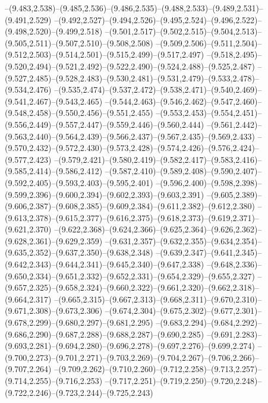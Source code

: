   --(9.483,2.538)--(9.485,2.536)--(9.486,2.535)--(9.488,2.533)--(9.489,2.531)--(9.491,2.529)%
  --(9.492,2.527)--(9.494,2.526)--(9.495,2.524)--(9.496,2.522)--(9.498,2.520)--(9.499,2.518)%
  --(9.501,2.517)--(9.502,2.515)--(9.504,2.513)--(9.505,2.511)--(9.507,2.510)--(9.508,2.508)%
  --(9.509,2.506)--(9.511,2.504)--(9.512,2.503)--(9.514,2.501)--(9.515,2.499)--(9.517,2.497)%
  --(9.518,2.495)--(9.520,2.494)--(9.521,2.492)--(9.522,2.490)--(9.524,2.488)--(9.525,2.487)%
  --(9.527,2.485)--(9.528,2.483)--(9.530,2.481)--(9.531,2.479)--(9.533,2.478)--(9.534,2.476)%
  --(9.535,2.474)--(9.537,2.472)--(9.538,2.471)--(9.540,2.469)--(9.541,2.467)--(9.543,2.465)%
  --(9.544,2.463)--(9.546,2.462)--(9.547,2.460)--(9.548,2.458)--(9.550,2.456)--(9.551,2.455)%
  --(9.553,2.453)--(9.554,2.451)--(9.556,2.449)--(9.557,2.447)--(9.559,2.446)--(9.560,2.444)%
  --(9.561,2.442)--(9.563,2.440)--(9.564,2.439)--(9.566,2.437)--(9.567,2.435)--(9.569,2.433)%
  --(9.570,2.432)--(9.572,2.430)--(9.573,2.428)--(9.574,2.426)--(9.576,2.424)--(9.577,2.423)%
  --(9.579,2.421)--(9.580,2.419)--(9.582,2.417)--(9.583,2.416)--(9.585,2.414)--(9.586,2.412)%
  --(9.587,2.410)--(9.589,2.408)--(9.590,2.407)--(9.592,2.405)--(9.593,2.403)--(9.595,2.401)%
  --(9.596,2.400)--(9.598,2.398)--(9.599,2.396)--(9.600,2.394)--(9.602,2.393)--(9.603,2.391)%
  --(9.605,2.389)--(9.606,2.387)--(9.608,2.385)--(9.609,2.384)--(9.611,2.382)--(9.612,2.380)%
  --(9.613,2.378)--(9.615,2.377)--(9.616,2.375)--(9.618,2.373)--(9.619,2.371)--(9.621,2.370)%
  --(9.622,2.368)--(9.624,2.366)--(9.625,2.364)--(9.626,2.362)--(9.628,2.361)--(9.629,2.359)%
  --(9.631,2.357)--(9.632,2.355)--(9.634,2.354)--(9.635,2.352)--(9.637,2.350)--(9.638,2.348)%
  --(9.639,2.347)--(9.641,2.345)--(9.642,2.343)--(9.644,2.341)--(9.645,2.340)--(9.647,2.338)%
  --(9.648,2.336)--(9.650,2.334)--(9.651,2.332)--(9.652,2.331)--(9.654,2.329)--(9.655,2.327)%
  --(9.657,2.325)--(9.658,2.324)--(9.660,2.322)--(9.661,2.320)--(9.662,2.318)--(9.664,2.317)%
  --(9.665,2.315)--(9.667,2.313)--(9.668,2.311)--(9.670,2.310)--(9.671,2.308)--(9.673,2.306)%
  --(9.674,2.304)--(9.675,2.302)--(9.677,2.301)--(9.678,2.299)--(9.680,2.297)--(9.681,2.295)%
  --(9.683,2.294)--(9.684,2.292)--(9.686,2.290)--(9.687,2.288)--(9.688,2.287)--(9.690,2.285)%
  --(9.691,2.283)--(9.693,2.281)--(9.694,2.280)--(9.696,2.278)--(9.697,2.276)--(9.699,2.274)%
  --(9.700,2.273)--(9.701,2.271)--(9.703,2.269)--(9.704,2.267)--(9.706,2.266)--(9.707,2.264)%
  --(9.709,2.262)--(9.710,2.260)--(9.712,2.258)--(9.713,2.257)--(9.714,2.255)--(9.716,2.253)%
  --(9.717,2.251)--(9.719,2.250)--(9.720,2.248)--(9.722,2.246)--(9.723,2.244)--(9.725,2.243)%
